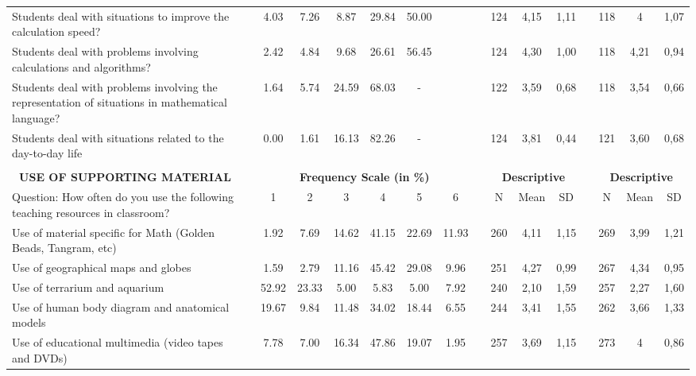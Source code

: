 \documentclass[a4paper, 12pt]{article}
\begin{document}
\begin{landscape}
\begin{table}[htbp]
\begin{adjustbox}{width=10.5in,totalheight=6in}
\begin{tabular}{llcccccccccccccc}
    Students deal with situations to improve the calculation speed? &       & 4.03  & 7.26  & 8.87  & 29.84 & 50.00 &       &       & 124   & 4,15  & 1,11  &       & 118   & 4     & 1,07 \\
    Students deal with problems involving calculations and algorithms? &       & 2.42  & 4.84  & 9.68  & 26.61 & 56.45 &       &       & 124   & 4,30  & 1,00  &       & 118   & 4,21  & 0,94 \\
    Students deal with problems involving the representation of situations in mathematical language? &       & 1.64  & 5.74  & 24.59 & 68.03 & -     &       &       & 122   & 3,59  & 0,68  &       & 118   & 3,54  & 0,66 \\
    Students deal with situations related to the day-to-day life &       & 0.00  & 1.61  & 16.13 & 82.26 & -     &       &       & 124   & 3,81  & 0,44  &       & 121   & 3,60  & 0,68 \\
          &       &       &       &       &       &       &       &       &       &       &       &       &       &       &  \\
    \multicolumn{1}{c}{\textbf{USE OF SUPPORTING MATERIAL}} &       & \multicolumn{6}{c}{\textbf{Frequency Scale (in \%)}} &       & \multicolumn{3}{c}{\textbf{Descriptive}} &       & \multicolumn{3}{c}{\textbf{Descriptive}} \\
\cmidrule{1-1}\cmidrule{3-8}\cmidrule{10-12}\cmidrule{14-16}    Question: How often do you use the following teaching resources in classroom? &       & 1     & 2     & 3     & 4     & 5     & 6     &       & N     & Mean  & SD    &       & N     & Mean  & SD \\
\cmidrule{1-1}\cmidrule{3-8}\cmidrule{10-12}\cmidrule{14-16}    Use of material specific for Math (Golden Beads, Tangram, etc) &       & 1.92  & 7.69  & 14.62 & 41.15 & 22.69 & 11.93 &       & 260   & 4,11  & 1,15  &       & 269   & 3,99  & 1,21 \\
    Use of geographical maps and globes &       & 1.59  & 2.79  & 11.16 & 45.42 & 29.08 & 9.96  &       & 251   & 4,27  & 0,99  &       & 267   & 4,34  & 0,95 \\
    Use of terrarium and aquarium &       & 52.92 & 23.33 & 5.00  & 5.83  & 5.00  & 7.92  &       & 240   & 2,10  & 1,59  &       & 257   & 2,27  & 1,60 \\
    Use of human body diagram and anatomical models &       & 19.67 & 9.84  & 11.48 & 34.02 & 18.44 & 6.55  &       & 244   & 3,41  & 1,55  &       & 262   & 3,66  & 1,33 \\
    Use of educational multimedia (video tapes and DVDs) &       & 7.78  & 7.00  & 16.34 & 47.86 & 19.07 & 1.95  &       & 257   & 3,69  & 1,15  &       & 273   & 4     & 0,86 \\

\end{tabular}
\end{adjustbox}
\end{table}
\end{landscape}
\end{document}
